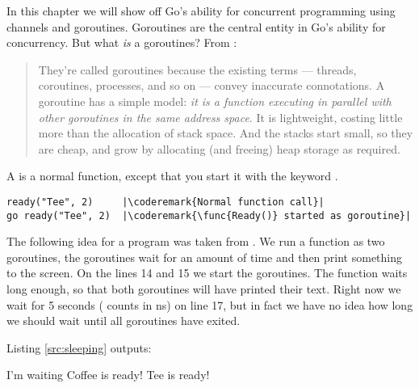 \noindent{}In this chapter we will show off Go's ability for
concurrent programming using channels and goroutines. Goroutines
are the central entity in Go's ability for concurrency. But what
\emph{is} a goroutines? From \cite{effective_go}:
\begin{quote}
They're called goroutines because the existing terms --- threads, coroutines,
processes, and so on --- convey inaccurate connotations. A goroutine has a simple
model: \emph{it is a function executing in parallel with other goroutines in the same
address space}. It is lightweight, costing little more than the allocation of
stack space. And the stacks start small, so they are cheap, and grow by
allocating (and freeing) heap storage as required.
\end{quote}
A  is a normal function, except that you start
it with the keyword .
\begin{lstlisting}
ready("Tee", 2)	    |\coderemark{Normal function call}|
go ready("Tee", 2)  |\coderemark{\func{Ready()} started as goroutine}|
\end{lstlisting}
The following idea for a program was taken from \cite{go_course_day3}. 
We run a function as two goroutines, the goroutines wait for an amount of
time and then print something to the screen. 
On the lines 14 and 15 we start the goroutines.
The  function
waits long enough, so that both goroutines will have printed their text. Right
now we wait for 5 seconds ( counts in ns) on line 17, but in fact we have no idea how
long we should wait until all goroutines have exited.

Listing \ref{src:sleeping} outputs:
\begin{display}
I'm waiting         
Coffee is ready!    
Tee is ready!       
\end{display}

